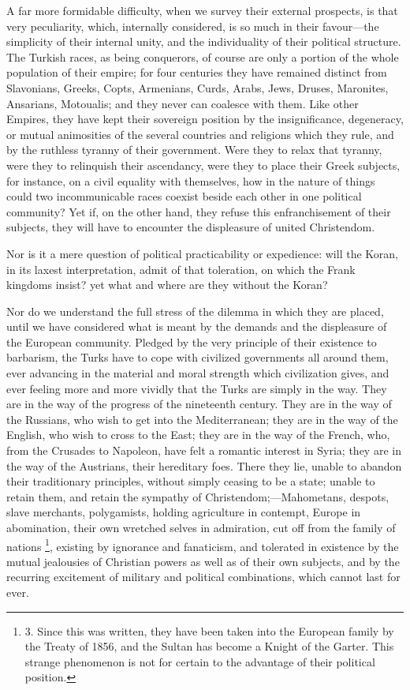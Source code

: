 A far more formidable
difficulty, when we survey their external prospects, is that very
peculiarity, which, internally considered, is so much in their favour—the
simplicity of their internal unity, and the individuality of their
political structure. The Turkish races, as being conquerors, of
course are only a portion of the whole population of their empire; for
four centuries they have remained distinct from Slavonians, Greeks,
Copts, Armenians, Curds, Arabs, Jews, Druses, Maronites, Ansarians,
Motoualis; and they never can coalesce with them. Like other Empires,
they have kept their sovereign position by the insignificance,
degeneracy, or mutual animosities of the several countries and
religions which they rule, and by the ruthless tyranny of their
government. Were they to relax that tyranny, were they to relinquish
their ascendancy, were they to place their Greek subjects, for
instance, on a civil equality with themselves, how in the nature of
things could two incommunicable races coexist beside each other in one
political community? Yet if, on the other hand, they refuse this
enfranchisement of their subjects, they will have to encounter the
displeasure of united Christendom.

Nor is it a mere question of
political practicability or expedience: will the Koran, in its laxest
interpretation, admit of that toleration, on which the Frank kingdoms
insist? yet what and where are they without the Koran?

Nor do we understand the full
stress of the dilemma in which they are placed, until we have
considered what is meant by the demands and the displeasure of the
European community. Pledged by the very principle of their existence
to barbarism, the Turks have to cope with civilized governments all
around them, ever advancing in the material and moral strength which
civilization gives, and ever feeling more and more vividly that the
Turks are simply in the way. They are in the way of the progress of
the nineteenth century. They are in the way of the Russians, who wish
to get into the Mediterranean; they are in the way of the English,
who wish to cross to the East; they are in the way of the
French, who, from the Crusades to Napoleon, have felt a romantic
interest in Syria; they are in the way of the Austrians, their
hereditary foes. There they lie, unable to abandon their traditionary
principles, without simply ceasing to be a state; unable to retain
them, and retain the sympathy of Christendom;—Mahometans, despots,
slave merchants, polygamists, holding agriculture in contempt, Europe
in abomination, their own wretched selves in admiration, cut off from
the family of nations \footnote{3.
Since this was written, they have been taken into the European family
by the Treaty of 1856, and the Sultan has become a Knight of the
Garter. This strange phenomenon is not for certain to the advantage of
their political position.},
existing by ignorance and fanaticism, and tolerated in existence by
the mutual jealousies of Christian powers as well as of their own
subjects, and by the recurring excitement of military and political
combinations, which cannot last for ever.

